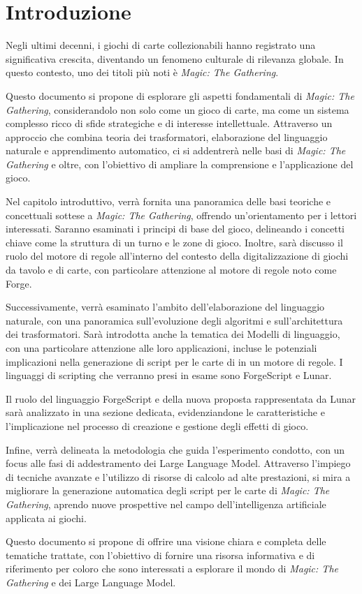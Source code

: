 \chapter*{Introduzione}\label{chapter:introduction}

Negli ultimi decenni, i giochi di carte collezionabili hanno registrato una significativa crescita, diventando un fenomeno culturale di rilevanza globale. In questo contesto, uno dei titoli più noti è \emph{Magic: The Gathering}.

Questo documento si propone di esplorare gli aspetti fondamentali di \textit{Magic: The Gathering}, considerandolo non solo come un gioco di carte, ma come un sistema complesso ricco di sfide strategiche e di interesse intellettuale. Attraverso un approccio che combina teoria dei trasformatori, elaborazione del linguaggio naturale e apprendimento automatico, ci si addentrerà nelle basi di \textit{Magic: The Gathering} e oltre, con l'obiettivo di ampliare la comprensione e l'applicazione del gioco.

Nel capitolo introduttivo, verrà fornita una panoramica delle basi teoriche e concettuali sottese a \textit{Magic: The Gathering}, offrendo un'orientamento per i lettori interessati. Saranno esaminati i principi di base del gioco, delineando i concetti chiave come la struttura di un turno e le zone di gioco. Inoltre, sarà discusso il ruolo del motore di regole all'interno del contesto della digitalizzazione di giochi da tavolo e di carte, con particolare attenzione al motore di regole noto come Forge.

Successivamente, verrà esaminato l'ambito dell'elaborazione del linguaggio naturale, con una panoramica sull'evoluzione degli algoritmi e sull'architettura dei trasformatori. Sarà introdotta anche la tematica dei Modelli di linguaggio, con una particolare attenzione alle loro applicazioni, incluse le potenziali implicazioni nella generazione di script per le carte di in un motore di regole. I linguaggi di scripting che verranno presi in esame sono ForgeScript e Lunar.

Il ruolo del linguaggio ForgeScript e della nuova proposta rappresentata da Lunar sarà analizzato in una sezione dedicata, evidenziandone le caratteristiche e l'implicazione nel processo di creazione e gestione degli effetti di gioco. 

Infine, verrà delineata la metodologia che guida l'esperimento condotto, con un focus alle fasi di addestramento dei Large Language Model. Attraverso l'impiego di tecniche avanzate e l'utilizzo di risorse di calcolo ad alte prestazioni, si mira a migliorare la generazione automatica degli script per le carte di \textit{Magic: The Gathering}, aprendo nuove prospettive nel campo dell'intelligenza artificiale applicata ai giochi.

Questo documento si propone di offrire una visione chiara e completa delle tematiche trattate, con l'obiettivo di fornire una risorsa informativa e di riferimento per coloro che sono interessati a esplorare il mondo di \emph{Magic: The Gathering} e dei Large Language Model.